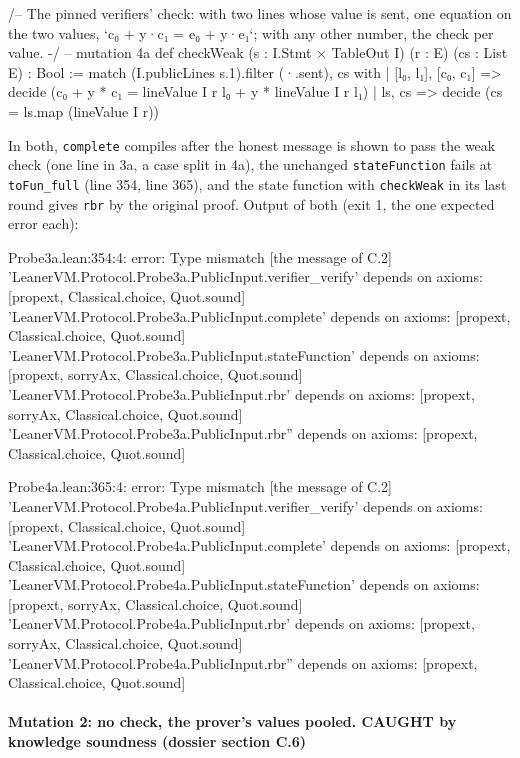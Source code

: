 \begin{leancode}
/-- The pinned verifiers' check: with two lines whose value is sent, one equation on the two
values, `c₀ + y·c₁ = e₀ + y·e₁`; with any other number, the check per value. -/   -- mutation 4a
def checkWeak (s : I.Stmt × TableOut I) (r : E) (cs : List E) : Bool :=
  match (I.publicLines s.1).filter (·.sent), cs with
  | [l₀, l₁], [c₀, c₁] => decide (c₀ + y * c₁ = lineValue I r l₀ + y * lineValue I r l₁)
  | ls, cs => decide (cs = ls.map (lineValue I r))
\end{leancode}

In both, \texttt{complete} compiles after the honest message is shown to pass the weak check (one line in 3a, a case split in 4a), the unchanged \texttt{stateFunction} fails at \texttt{toFun\_\allowbreak{}full} (line 354, line 365), and the state function with \texttt{checkWeak} in its last round gives \texttt{rbr\textquotesingle{}} by the original proof. Output of both (exit 1, the one expected error each):

\begin{srccode}
Probe3a.lean:354:4: error: Type mismatch   [the message of C.2]
'LeanerVM.Protocol.Probe3a.PublicInput.verifier_verify' depends on axioms: [propext, Classical.choice, Quot.sound]
'LeanerVM.Protocol.Probe3a.PublicInput.complete' depends on axioms: [propext, Classical.choice, Quot.sound]
'LeanerVM.Protocol.Probe3a.PublicInput.stateFunction' depends on axioms: [propext, sorryAx, Classical.choice, Quot.sound]
'LeanerVM.Protocol.Probe3a.PublicInput.rbr' depends on axioms: [propext, sorryAx, Classical.choice, Quot.sound]
'LeanerVM.Protocol.Probe3a.PublicInput.rbr'' depends on axioms: [propext, Classical.choice, Quot.sound]

Probe4a.lean:365:4: error: Type mismatch   [the message of C.2]
'LeanerVM.Protocol.Probe4a.PublicInput.verifier_verify' depends on axioms: [propext, Classical.choice, Quot.sound]
'LeanerVM.Protocol.Probe4a.PublicInput.complete' depends on axioms: [propext, Classical.choice, Quot.sound]
'LeanerVM.Protocol.Probe4a.PublicInput.stateFunction' depends on axioms: [propext, sorryAx, Classical.choice, Quot.sound]
'LeanerVM.Protocol.Probe4a.PublicInput.rbr' depends on axioms: [propext, sorryAx, Classical.choice, Quot.sound]
'LeanerVM.Protocol.Probe4a.PublicInput.rbr'' depends on axioms: [propext, Classical.choice, Quot.sound]
\end{srccode}

\paragraph{Mutation 2: no check, the prover's values pooled. CAUGHT by knowledge soundness (dossier section C.6)}\label{sec:gen-pubinput-C6}

